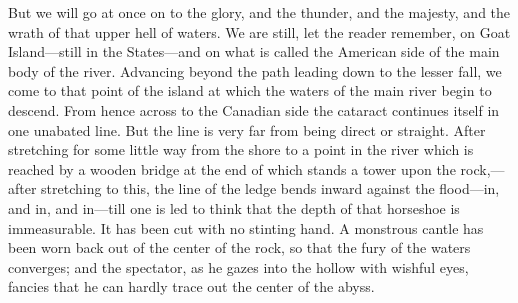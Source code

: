 But we will go at once on to the glory, and the thunder, and the
majesty, and the wrath of that upper hell of waters.  We are still,
let the reader remember, on Goat Island---still in the States---and
on what is called the American side of the main body of the river.
Advancing beyond the path leading down to the lesser fall, we come
to that point of the island at which the waters of the main river
begin to descend.  From hence across to the Canadian side the
cataract continues itself in one unabated line.  But the line is
very far from being direct or straight.  After stretching for some
little way from the shore to a point in the river which is reached
by a wooden bridge at the end of which stands a tower upon the
rock,---after stretching to this, the line of the ledge bends inward
against the flood---in, and in, and in---till one is led to think
that the depth of that horseshoe is immeasurable.  It has been cut
with no stinting hand.  A monstrous cantle has been worn back out
of the center of the rock, so that the fury of the waters
converges; and the spectator, as he gazes into the hollow with
wishful eyes, fancies that he can hardly trace out the center of
the abyss.

